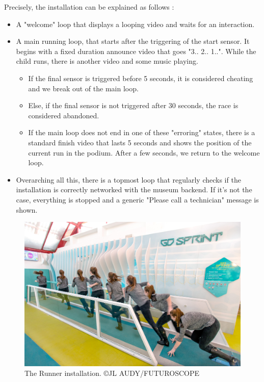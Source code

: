 \documentclass{sigchi}
\begin{document}
Precisely, the installation can be explained as follows : 
\begin{itemize}
    \item A "welcome" loop that displays a looping video and waits for an interaction.
    \item A main running loop, that starts after the triggering of the start sensor. It begins with a fixed duration announce video that goes "3.. 2.. 1..". While the child runs, there is another video and some music playing. 
    \begin{itemize}
    	\item If the final sensor is triggered before 5 seconds, it is considered cheating and we break out of the main loop.
    	
    	\item Else, if the final sensor is not triggered after 30 seconds, the race is considered abandoned. 
    	
    	\item If the main loop does not end in one of these "erroring" states, there is a standard finish video that lasts 5 seconds and shows the position of the current run in the podium. After a few seconds, we return to the welcome loop.
    \end{itemize}
      
    
    \item Overarching all this, there is a topmost loop that regularly checks if the installation is correctly networked with the museum backend. If it's not the case, everything is stopped and a generic "Please call a technician" message is shown.
\end{itemize}

\begin{figure}
    \centering
    \includegraphics[scale=0.6]{images/futuroscope.jpg}
    \caption{The Runner installation. \tiny{©JL AUDY/FUTUROSCOPE}}
    \label{fig.futuroscope}
\end{figure}
\end{document}

